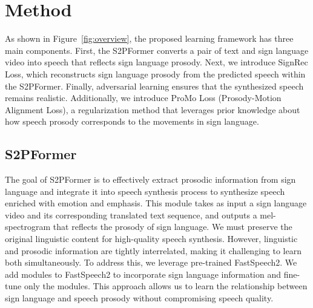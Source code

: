 \section{Method}
\label{sec:method}


As shown in Figure~\ref{fig:overview}, 
the proposed learning framework has three main components.
First, the S2PFormer converts a pair of text and sign language video into speech that reflects sign language prosody.
Next, we introduce SignRec Loss, which reconstructs sign language prosody from the predicted speech within the S2PFormer. 
Finally, adversarial learning ensures that the synthesized speech remains realistic.
Additionally, we introduce ProMo Loss (Prosody-Motion Alignment Loss),
a regularization method that leverages prior knowledge about
how speech prosody corresponds to the movements in sign language.
\subsection{S2PFormer}
\label{sec:ts2s}

The goal of S2PFormer is to effectively extract prosodic information from sign language and integrate it into speech synthesis process to synthesize speech enriched with emotion and emphasis. This module takes as input a sign language video and its corresponding translated text sequence, and outputs a mel-spectrogram that reflects the prosody of sign language.
We must preserve the original linguistic content for high-quality speech synthesis. However, linguistic and prosodic information are tightly interrelated, making it challenging to learn both simultaneously. To address this, we leverage pre-trained FastSpeech2.
We add modules to FastSpeech2 to incorporate sign language information and fine-tune only the modules.
This approach allows us to learn the relationship between sign language and speech prosody without compromising speech quality.

